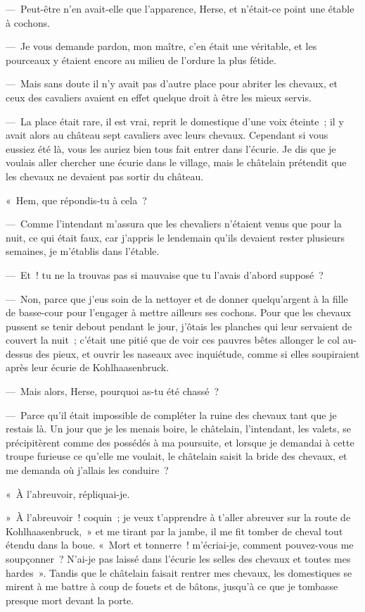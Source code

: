 \documentclass[french,twoside]{book} %
\begin{document}
— Peut-être n’en avait-elle que l’apparence, Herse, et n’était-ce point une étable à cochons.\par
— Je vous demande pardon, mon maître, c’en était une véritable, et les pourceaux y étaient encore au milieu de l’ordure la plus fétide.\par
— Mais sans doute il n’y avait pas d’autre place pour abriter les chevaux, et ceux des cavaliers avaient en effet quelque droit à être les mieux servis.\par
— La place était rare, il est vrai, reprit le domestique d’une voix éteinte ; il y avait alors au château sept cavaliers avec leurs chevaux. Cependant si vous eussiez été là, vous les auriez bien tous fait entrer dans l’écurie. Je dis que je voulais aller chercher une écurie dans le village, mais le châtelain prétendit que les chevaux ne devaient pas sortir du château.\par
« Hem, que répondis-tu à cela ?\par
— Comme l’intendant m’assura que les chevaliers n’étaient venus que pour la nuit, ce qui était faux, car j’appris le lendemain qu’ils devaient rester plusieurs semaines, je m’établis dans l’étable.\par
— Et ! tu ne la trouvas pas si mauvaise que tu l’avais d’abord supposé ?\par
— Non, parce que j’eus soin de la nettoyer et de donner quelqu’argent à la fille de basse-cour pour l’engager à mettre ailleurs ses cochons. Pour que les chevaux pussent se tenir debout pendant le jour, j’ôtais les planches qui leur servaient de couvert la nuit ; c’était une pitié que de voir ces pauvres bêtes allonger le col au-dessus des pieux, et ouvrir les naseaux avec inquiétude, comme si elles soupiraient après leur écurie de Kohlhaasenbruck.\par
— Mais alors, Herse, pourquoi as-tu été chassé ?\par
— Parce qu’il était impossible de compléter la ruine des chevaux tant que je restais là. Un jour que je les menais boire, le châtelain, l’intendant, les valets, se précipitèrent comme des possédés à ma poursuite, et lorsque je demandai à cette troupe furieuse ce qu’elle me voulait, le châtelain saisit la bride des chevaux, et me demanda où j’allais les conduire ?\par
« À l’abreuvoir, répliquai-je.\par
» À l’abreuvoir ! coquin ; je veux t’apprendre à t’aller abreuver sur la route de Kohlhaasenbruck, » et me tirant par la jambe, il me fit tomber de cheval tout étendu dans la boue. « Mort et tonnerre ! m’écriai-je, comment pouvez-vous me soupçonner ? N’ai-je pas laissé dans l’écurie les selles des chevaux et toutes mes hardes ». Tandis que le châtelain faisait rentrer mes chevaux, les domestiques se mirent à me battre à coup de fouets et de bâtons, jusqu’à ce que je tombasse presque mort devant la porte.\par
\end{document}
